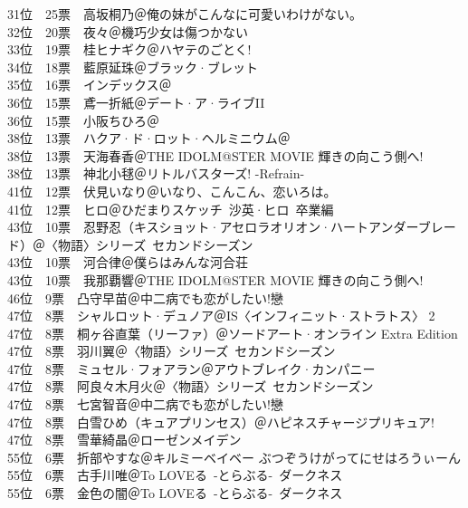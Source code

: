 { 31位　25票　高坂桐乃＠俺の妹がこんなに可愛いわけがない。\\
 32位　20票　夜々＠機巧少女は傷つかない\\
 33位　19票　桂ヒナギク＠ハヤテのごとく!\\
 34位　18票　藍原延珠＠ブラック·ブレット\\
 35位　16票　インデックス＠\Railgan\\
 36位　15票　鳶一折紙＠デート·ア·ライブII\\
 36位　15票　小阪ちひろ＠\Kaminomi\\
 38位　13票　ハクア·ド·ロット·ヘルミニウム＠\Kaminomi\\
 38位　13票　天海春香＠THE IDOLM@STER MOVIE 輝きの向こう側へ!\\
 38位　13票　神北小毬＠リトルバスターズ! -Refrain-\\
 41位　12票　伏見いなり＠いなり、こんこん、恋いろは。\\
 41位　12票　ヒロ＠ひだまりスケッチ~沙英·ヒロ~卒業編\\
 43位　10票　忍野忍（キスショット·アセロラオリオン·ハートアンダーブレード）＠〈物語〉シリーズ~セカンドシーズン\\
 43位　10票　河合律＠僕らはみんな河合荘\\
 43位　10票　我那覇響＠THE IDOLM@STER MOVIE 輝きの向こう側へ!\\
 46位　9票　凸守早苗＠中二病でも恋がしたい!戀\\
 47位　8票　シャルロット·デュノア＠IS〈インフィニット·ストラトス〉 2\\
 47位　8票　桐ヶ谷直葉（リーファ）＠ソードアート·オンライン Extra Edition\\
 47位　8票　羽川翼＠〈物語〉シリーズ~セカンドシーズン\\
 47位　8票　ミュセル·フォアラン＠アウトブレイク·カンパニー\\
 47位　8票　阿良々木月火＠〈物語〉シリーズ~セカンドシーズン\\
 47位　8票　七宮智音＠中二病でも恋がしたい!戀\\
 47位　8票　白雪ひめ（キュアプリンセス）＠ハピネスチャージプリキュア!\\
 47位　8票　雪華綺晶＠ローゼンメイデン\\
 55位　6票　折部やすな＠キルミーベイベー ぶつぞうけがってにせはろうぃーん\\
 55位　6票　古手川唯＠To LOVEる~-とらぶる-~ダークネス\\
 55位　6票　金色の闇＠To LOVEる~-とらぶる-~ダークネス\\
}
